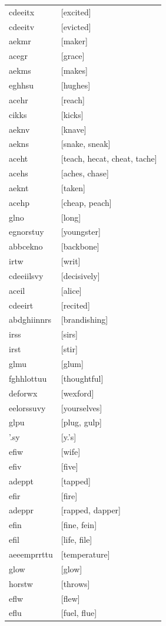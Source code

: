 \documentclass{article}
\begin{document}
\begin{tabular}{ll}
cdeeitx & [excited] \\
cdeeitv & [evicted] \\
aekmr & [maker] \\
acegr & [grace] \\
aekms & [makes] \\
eghhsu & [hughes] \\
acehr & [reach] \\
cikks & [kicks] \\
aeknv & [knave] \\
aekns & [snake, sneak] \\
aceht & [teach, hecat, cheat, tache] \\
acehs & [aches, chase] \\
aeknt & [taken] \\
acehp & [cheap, peach] \\
glno & [long] \\
egnorstuy & [youngster] \\
abbcekno & [backbone] \\
irtw & [writ] \\
cdeeiilsvy & [decisively] \\
aceil & [alice] \\
cdeeirt & [recited] \\
abdghiinnrs & [brandishing] \\
irss & [sirs] \\
irst & [stir] \\
glmu & [glum] \\
fghhlottuu & [thoughtful] \\
deforwx & [wexford] \\
eelorssuvy & [yourselves] \\
glpu & [plug, gulp] \\
'.sy & [y.'s] \\
efiw & [wife] \\
efiv & [five] \\
adeppt & [tapped] \\
efir & [fire] \\
adeppr & [rapped, dapper] \\
efin & [fine, fein] \\
efil & [life, file] \\
aeeemprrttu & [temperature] \\
glow & [glow] \\
horstw & [throws] \\
eflw & [flew] \\
eflu & [fuel, flue] \\

\end{tabular}
\end{document}
